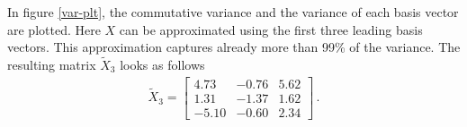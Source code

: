In figure \ref{var-plt}, the commutative variance and the variance of each basis vector are plotted.
Here \(X\) can be approximated using the first three leading basis vectors.
This approximation captures already more than 99\% of the variance.
The resulting matrix \(\tilde{X}_3\) looks as follows
\begin{gather}
\tilde{X}_3 = \begin{bmatrix}
4.73 & -0.76 & 5.62 \\
1.31 & -1.37 & 1.62 \\
-5.10 & -0.60 & 2.34
\end{bmatrix} \,.
\end{gather}





